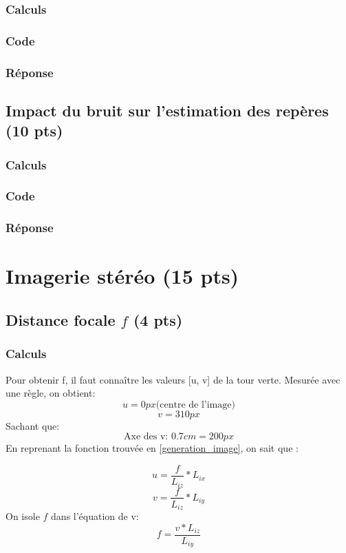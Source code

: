 \documentclass[12pt]{article}
\begin{document}
\subsubsection{Calculs}
\subsubsection{Code}
\subsubsection{Réponse}

\subsection{Impact du bruit sur l'estimation des repères (10 pts)}
\subsubsection{Calculs}
\subsubsection{Code}
\subsubsection{Réponse}

\newpage
\section{Imagerie stéréo  (15 pts)}

\subsection{Distance focale $f$ (4 pts)}
\subsubsection{Calculs}
Pour obtenir f, il faut connaître les valeurs [u, v] de la tour verte.
Mesur\'ee avec une r\`egle, on obtient:
\[ u = 0 px \text{(centre de l'image)}\]
\[ v = 310 px\]
Sachant que:
\[ \text{Axe des v: } 0.7cm = 200px \]
En reprenant la fonction trouv\'ee en \ref{generation_image}, on sait que :

\[
    u =  \frac{f}{L_{iz}} * L_{ix}
\]
\[
    v =  \frac{f}{L_{iz}} * L_{iy}
\]
On isole $f$ dans l'\'equation de v:
\[
    f =  \frac{v * L_{iz}}{L_{iy}}
\]
\end{document}
